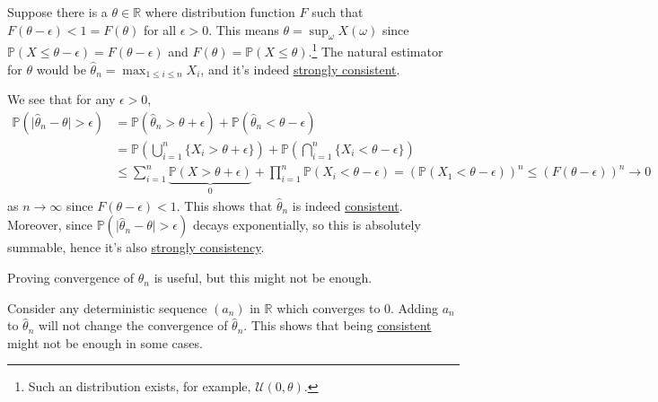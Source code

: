 \begin{eg}
	Suppose there is a \(\theta \in \mathbb{R} \) where distribution function \(F\) such that \(F(\theta - \epsilon ) < 1 = F(\theta )\) for all \(\epsilon > 0\). This means \(\theta = \sup_{\omega } X(\omega )\) since \(\mathbb{P} (X \leq \theta - \epsilon ) = F(\theta - \epsilon )\) and \(F(\theta ) = \mathbb{P} (X \leq \theta )\).\footnote{Such an distribution exists, for example, \(\mathcal{U} (0, \theta )\).} The natural estimator for \(\theta \) would be \(\hat{\theta} _n = \max _{1 \leq i \leq n} X_i \), and it's indeed \hyperref[def:strongly-consistent]{strongly consistent}.
\end{eg}
\begin{explanation}
	We see that for any \(\epsilon > 0\),
	\[
		\begin{split}
			\mathbb{P} (\vert \hat{\theta} _n - \theta \vert > \epsilon )
			 & = \mathbb{P} (\hat{\theta} _n > \theta + \epsilon ) + \mathbb{P} (\hat{\theta} _n < \theta - \epsilon )                                                  \\
			 & = \mathbb{P} \left( \bigcup_{i=1}^{n} \{ X_i > \theta + \epsilon \}  \right) + \mathbb{P} \left( \bigcap_{i=1}^{n} \{ X_i < \theta - \epsilon \} \right) \\
			 & \leq \sum_{i=1}^{n} \underbrace{\mathbb{P} (X > \theta + \epsilon )}_{0} + \prod_{i=1}^{n} \mathbb{P} (X_i < \theta -\epsilon )
			= \left( \mathbb{P} (X_1 < \theta - \epsilon ) \right) ^n
			\leq \left( F(\theta - \epsilon ) \right) ^n \to 0
		\end{split}
	\]
	as \(n \to \infty \) since \(F(\theta - \epsilon ) < 1\). This shows that \(\hat{\theta} _n\) is indeed \hyperref[def:consistent]{consistent}. Moreover, since \(\mathbb{P} (\vert \hat{\theta} _n - \theta \vert > \epsilon )\) decays exponentially, so this is absolutely summable, hence it's also \hyperref[def:strongly-consistent]{strongly consistency}.
\end{explanation}

Proving convergence of \(\hat{\theta} _n\) is useful, but this might not be enough.

\begin{eg}
	Consider any deterministic sequence \((a_n)\) in \(\mathbb{R} \) which converges to \(0\). Adding \(a_n\) to \(\hat{\theta} _n\) will not change the convergence of \(\hat{\theta} _n\). This shows that being \hyperref[def:consistent]{consistent} might not be enough in some cases.
\end{eg}

